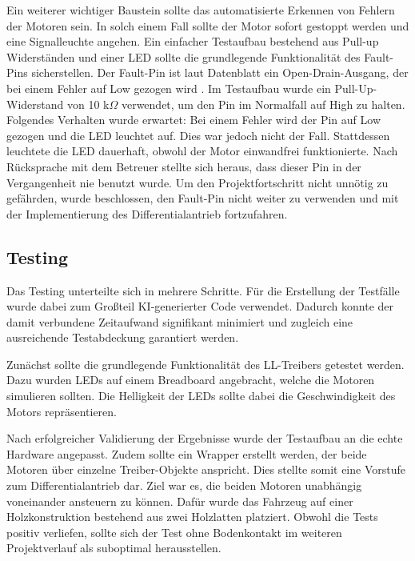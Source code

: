 Ein weiterer wichtiger Baustein sollte das automatisierte Erkennen von Fehlern der Motoren sein. In solch einem Fall sollte der Motor sofort gestoppt werden und eine Signalleuchte angehen. Ein einfacher Testaufbau bestehend aus Pull-up Widerständen und einer LED sollte die grundlegende Funktionalität des Fault-Pins sicherstellen. Der Fault-Pin ist laut Datenblatt ein Open-Drain-Ausgang, der bei einem Fehler auf Low gezogen wird \cite{pololu_g2_motor_driver}. Im Testaufbau wurde ein Pull-Up-Widerstand von 10 k$\Omega$ verwendet, um den Pin im Normalfall auf High zu halten. Folgendes Verhalten wurde erwartet: Bei einem Fehler wird der Pin auf Low gezogen und die LED leuchtet auf. Dies war jedoch nicht der Fall. Stattdessen leuchtete die LED dauerhaft, obwohl der Motor einwandfrei funktionierte. Nach Rücksprache mit dem Betreuer stellte sich heraus, dass dieser Pin in der Vergangenheit nie benutzt wurde. Um den Projektfortschritt nicht unnötig zu gefährden, wurde beschlossen, den Fault-Pin nicht weiter zu verwenden und mit der Implementierung des Differentialantrieb fortzufahren.

\subsection{Testing}

Das Testing unterteilte sich in mehrere Schritte. Für die Erstellung der Testfälle wurde dabei zum Großteil KI-generierter Code verwendet. Dadurch konnte der damit verbundene Zeitaufwand signifikant minimiert und zugleich eine ausreichende Testabdeckung garantiert werden. \newline

Zunächst sollte die grundlegende Funktionalität des LL-Treibers getestet werden. Dazu wurden LEDs auf einem Breadboard angebracht, welche die Motoren simulieren sollten. Die Helligkeit der LEDs sollte dabei die Geschwindigkeit des Motors repräsentieren. \newline

Nach erfolgreicher Validierung der Ergebnisse wurde der Testaufbau an die echte Hardware angepasst. Zudem sollte ein Wrapper erstellt werden, der beide Motoren über einzelne Treiber-Objekte anspricht. Dies stellte somit eine Vorstufe zum Differentialantrieb dar. Ziel war es, die beiden Motoren unabhängig voneinander ansteuern zu können. Dafür wurde das Fahrzeug auf einer Holzkonstruktion bestehend aus zwei Holzlatten platziert. Obwohl die Tests positiv verliefen, sollte sich der Test ohne Bodenkontakt im weiteren Projektverlauf als suboptimal herausstellen.

